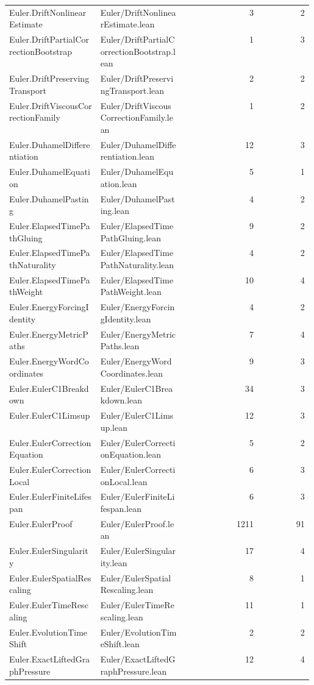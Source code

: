 \begin{longtable}{p{0.30\linewidth}p{0.28\linewidth}rr}
Euler.DriftNonlinearEstimate & Euler/DriftNonlinearEstimate.lean & 3 & 2\\
Euler.DriftPartialCorrectionBootstrap & Euler/DriftPartialCorrectionBootstrap.lean & 1 & 3\\
Euler.DriftPreservingTransport & Euler/DriftPreservingTransport.lean & 2 & 2\\
Euler.DriftViscousCorrectionFamily & Euler/DriftViscousCorrectionFamily.lean & 1 & 2\\
Euler.DuhamelDifferentiation & Euler/DuhamelDifferentiation.lean & 12 & 3\\
Euler.DuhamelEquation & Euler/DuhamelEquation.lean & 5 & 1\\
Euler.DuhamelPasting & Euler/DuhamelPasting.lean & 4 & 2\\
Euler.ElapsedTimePathGluing & Euler/ElapsedTimePathGluing.lean & 9 & 2\\
Euler.ElapsedTimePathNaturality & Euler/ElapsedTimePathNaturality.lean & 4 & 2\\
Euler.ElapsedTimePathWeight & Euler/ElapsedTimePathWeight.lean & 10 & 4\\
Euler.EnergyForcingIdentity & Euler/EnergyForcingIdentity.lean & 4 & 2\\
Euler.EnergyMetricPaths & Euler/EnergyMetricPaths.lean & 7 & 4\\
Euler.EnergyWordCoordinates & Euler/EnergyWordCoordinates.lean & 9 & 3\\
Euler.EulerC1Breakdown & Euler/EulerC1Breakdown.lean & 34 & 3\\
Euler.EulerC1Limsup & Euler/EulerC1Limsup.lean & 12 & 3\\
Euler.EulerCorrectionEquation & Euler/EulerCorrectionEquation.lean & 5 & 2\\
Euler.EulerCorrectionLocal & Euler/EulerCorrectionLocal.lean & 6 & 3\\
Euler.EulerFiniteLifespan & Euler/EulerFiniteLifespan.lean & 6 & 3\\
Euler.EulerProof & Euler/EulerProof.lean & 1211 & 91\\
Euler.EulerSingularity & Euler/EulerSingularity.lean & 17 & 4\\
Euler.EulerSpatialRescaling & Euler/EulerSpatialRescaling.lean & 8 & 1\\
Euler.EulerTimeRescaling & Euler/EulerTimeRescaling.lean & 11 & 1\\
Euler.EvolutionTimeShift & Euler/EvolutionTimeShift.lean & 2 & 2\\
Euler.ExactLiftedGraphPressure & Euler/ExactLiftedGraphPressure.lean & 12 & 4\\

\end{longtable}
